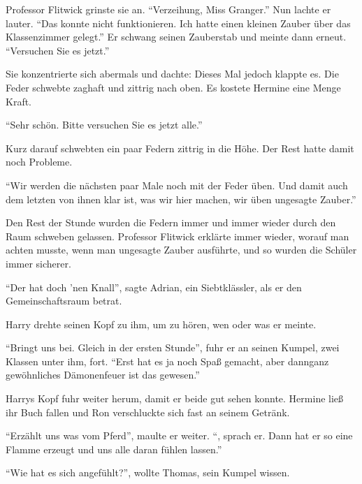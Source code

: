 Professor Flitwick grinste sie an. \enquote{Verzeihung, Miss Granger.} Nun lachte er lauter. \enquote{Das konnte nicht funktionieren. Ich hatte einen kleinen Zauber über das Klassenzimmer gelegt.} Er schwang seinen Zauberstab und meinte dann erneut. \enquote{Versuchen Sie es jetzt.}

Sie konzentrierte sich abermals und dachte:  Dieses Mal jedoch klappte es. Die Feder schwebte zaghaft und zittrig nach oben. Es kostete Hermine eine Menge Kraft.

\enquote{Sehr schön. Bitte versuchen Sie es jetzt alle.}

Kurz darauf schwebten ein paar Federn zittrig in die Höhe. Der Rest hatte damit noch Probleme.

\enquote{Wir werden die nächsten paar Male noch mit der Feder üben. Und damit auch dem letzten von ihnen klar ist, was wir hier machen, wir üben ungesagte Zauber.}

Den Rest der Stunde wurden die Federn immer und immer wieder durch den Raum schweben gelassen. Professor Flitwick erklärte immer wieder, worauf man achten musste, wenn man ungesagte Zauber ausführte, und so wurden die Schüler immer sicherer.

\trenn

\enquote{Der hat doch ’nen Knall}, sagte Adrian, ein Siebtklässler, als er den Gemeinschaftsraum betrat.

Harry drehte seinen Kopf zu ihm, um zu hören, wen oder was er meinte.

\enquote{Bringt uns  bei. Gleich in der ersten Stunde}, fuhr er an seinen Kumpel, zwei Klassen unter ihm, fort. \enquote{Erst hat es ja noch Spaß gemacht, aber dann\abs ganz gewöhnliches Dämonenfeuer ist das gewesen.}

Harrys Kopf fuhr weiter herum, damit er beide gut sehen konnte. Hermine ließ ihr Buch fallen und Ron verschluckte sich fast an seinem Getränk.

\enquote{Erzählt uns was vom Pferd\abs}, maulte er weiter. \enquote{, sprach er. Dann hat er so eine Flamme erzeugt und uns alle daran fühlen lassen.}

\enquote{Wie hat es sich angefühlt?}, wollte Thomas, sein Kumpel wissen.

